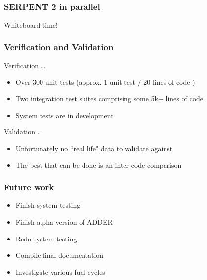 \documentclass{beamer}
\begin{document}
\begin{frame}
\frametitle{SERPENT 2 in parallel}

    Whiteboard time!

\end{frame}

\begin{frame}
\frametitle{Verification and Validation}

    Verification \ldots

    \hspace{1cm}

    \begin{itemize}
        \item Over 300 unit tests (approx. 1 unit test / 20 lines of code )
        \item Two integration test suites comprising some 5k+ lines of code
        \item System tests are in development
    \end{itemize}

    \hspace{2cm}

    Validation \ldots

    \hspace{1cm}

    \begin{itemize}
        \item Unfortunately no ``real life" data to validate against
        \item The best that can be done is an inter-code comparison
    \end{itemize}

\end{frame}

\begin{frame}
\frametitle{Future work}

    \begin{itemize}

        \item Finish system testing
        \item Finish alpha version of ADDER
        \item Redo system testing
        \item Compile final documentation
        \item Investigate various fuel cycles

    \end{itemize}

\end{frame}
\end{document}
